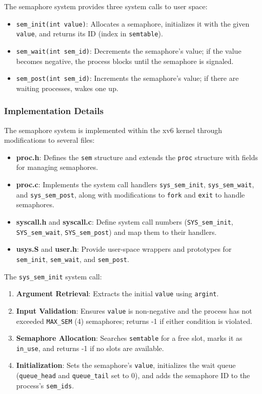 \documentclass[12pt]{article}
\begin{document}
The semaphore system provides three system calls to user space:
\begin{itemize}
  \item \texttt{sem\_init(int value)}: Allocates a semaphore, initializes it with the given \texttt{value}, and returns its ID (index in \texttt{semtable}).
  \item \texttt{sem\_wait(int sem\_id)}: Decrements the semaphore’s value; if the value becomes negative, the process blocks until the semaphore is signaled.
  \item \texttt{sem\_post(int sem\_id)}: Increments the semaphore’s value; if there are waiting processes, wakes one up.
\end{itemize}

\subsubsection{Implementation Details}
\label{subsubsec:semaphore-implementation-details}

The semaphore system is implemented within the xv6 kernel through modifications to several files:

\begin{itemize}
  \item \textbf{proc.h}: Defines the \texttt{sem} structure and extends the \texttt{proc} structure with fields for managing semaphores.
  \item \textbf{proc.c}: Implements the system call handlers \texttt{sys\_sem\_init}, \texttt{sys\_sem\_wait}, and \texttt{sys\_sem\_post}, along with modifications to \texttt{fork} and \texttt{exit} to handle semaphores.
  \item \textbf{syscall.h} and \textbf{syscall.c}: Define system call numbers (\texttt{SYS\_sem\_init}, \texttt{SYS\_sem\_wait}, \texttt{SYS\_sem\_post}) and map them to their handlers.
  \item \textbf{usys.S} and \textbf{user.h}: Provide user-space wrappers and prototypes for \texttt{sem\_init}, \texttt{sem\_wait}, and \texttt{sem\_post}.
\end{itemize}

The \texttt{sys\_sem\_init} system call:
\begin{enumerate}
  \item \textbf{Argument Retrieval}: Extracts the initial \texttt{value} using \texttt{argint}.
  \item \textbf{Input Validation}: Ensures \texttt{value} is non-negative and the process has not exceeded \texttt{MAX\_SEM} (4) semaphores; returns -1 if either condition is violated.
  \item \textbf{Semaphore Allocation}: Searches \texttt{semtable} for a free slot, marks it as \texttt{in\_use}, and returns -1 if no slots are available.
  \item \textbf{Initialization}: Sets the semaphore’s \texttt{value}, initializes the wait queue (\texttt{queue\_head} and \texttt{queue\_tail} set to 0), and adds the semaphore ID to the process’s \texttt{sem\_ids}.
\end{enumerate}
\end{document}
